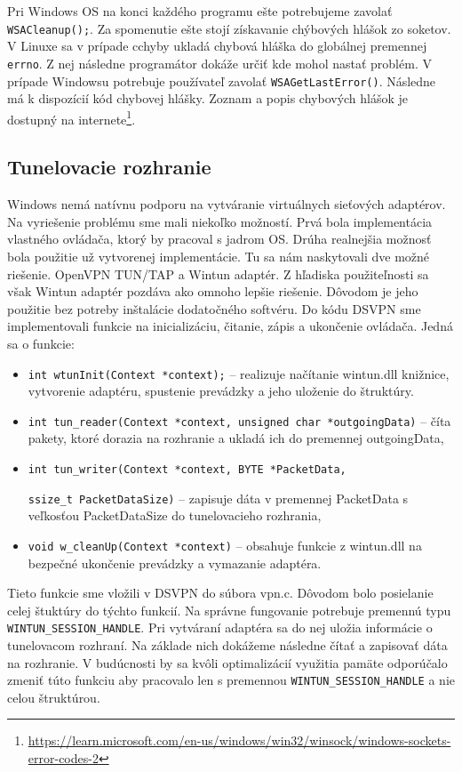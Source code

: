 Pri Windows OS na konci každého programu ešte potrebujeme zavolať \lstinline|WSACleanup();|. Za spomenutie ešte stojí získavanie chýbových hlášok zo soketov. V Linuxe sa v prípade cchyby ukladá chybová hláška do globálnej premennej  \lstinline|errno|. Z nej následne programátor dokáže určiť kde mohol nastať problém. V prípade Windowsu potrebuje používateľ zavolať \lstinline|WSAGetLastError()|. Následne má k dispozícií kód chybovej hlášky. Zoznam a popis chybových hlášok je dostupný na internete\footnote{\url{https://learn.microsoft.com/en-us/windows/win32/winsock/windows-sockets-error-codes-2}}.  
\subsection{Tunelovacie rozhranie}
Windows nemá natívnu podporu na vytváranie virtuálnych sieťových adaptérov. Na vyriešenie problému sme mali niekoľko možností. Prvá bola implementácia vlastného ovládača, ktorý by pracoval s jadrom OS. Drúha realnejšia možnosť bola použitie už vytvorenej implementácie. Tu sa nám naskytovali dve možné riešenie. OpenVPN TUN/TAP a Wintun adaptér. Z hľadiska použiteľnosti sa však Wintun adaptér pozdáva ako omnoho lepšie riešenie. Dôvodom je jeho použitie bez potreby inštalácie dodatočného softvéru. 
Do kódu DSVPN sme implementovali funkcie na inicializáciu, čitanie, zápis a ukončenie ovládača. Jedná sa o funkcie: 
\begin{itemize}
	\item\lstinline|int wtunInit(Context *context);| -- realizuje načítanie wintun.dll knižnice, vytvorenie adaptéru, spustenie prevádzky a jeho uloženie do štruktúry.
	\item\lstinline|int tun_reader(Context *context, unsigned char *outgoingData)| -- číta pakety, ktoré dorazia na rozhranie a ukladá ich do premennej outgoingData,
	\item\lstinline|int tun_writer(Context *context, BYTE *PacketData,| 
	
		\lstinline|ssize_t PacketDataSize)| -- zapisuje dáta v premennej PacketData s veľkosťou PacketDataSize do tunelovacieho rozhrania,
	\item\lstinline|void w_cleanUp(Context *context)| -- obsahuje funkcie z wintun.dll na bezpečné ukončenie prevádzky a vymazanie adaptéra.
\end{itemize} 

Tieto funkcie sme vložili v DSVPN do súbora vpn.c. Dôvodom bolo posielanie celej štuktúry do týchto funkcií. Na správne fungovanie potrebuje premennú typu \lstinline|WINTUN_SESSION_HANDLE|. Pri vytváraní adaptéra sa do nej uložia informácie o tunelovacom rozhraní. Na základe nich dokážeme následne čítať a zapisovať dáta na rozhranie. V budúcnosti by sa kvôli optimalizácií využitia pamäte odporúčalo zmeniť túto funkciu aby pracovalo len s premennou \lstinline|WINTUN_SESSION_HANDLE| a nie celou štruktúrou.

